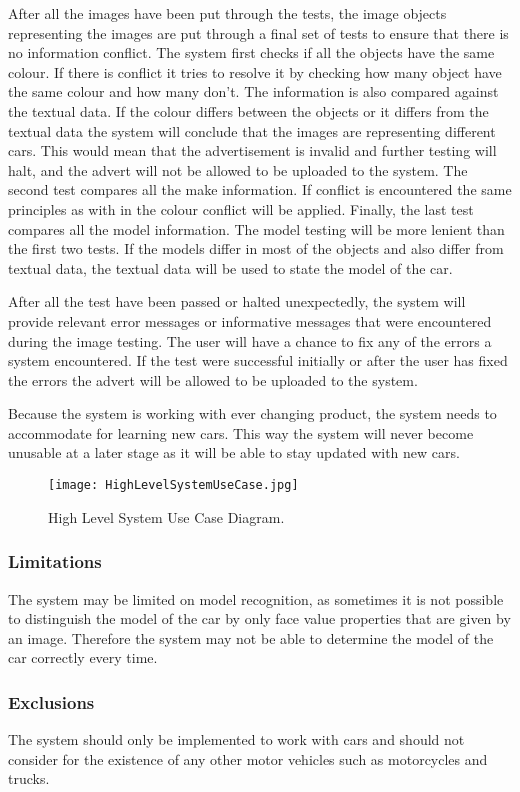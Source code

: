 After all the images have been put through the tests, the image objects representing the images are  put through a final set of tests to ensure that there is no information conflict. The system first checks if all the objects have the same colour. If  there is conflict it tries to resolve it by checking how many object have the same colour and how many don't. The information is also compared against the textual data. If the colour differs between the objects or it differs from the textual data the system will conclude that the images are representing different cars. This would mean that the advertisement is invalid and further testing will halt, and the advert will not be allowed to be uploaded to the system. The second test compares all the make information. If conflict is encountered the same principles as with in the colour conflict will be applied. Finally, the last test compares all the model information. The model testing will be more lenient than the first two tests. If the models differ in most of the objects and also differ from textual data, the textual data will be used to state the model of the car.

After all the test have been passed or halted unexpectedly, the system will provide relevant error messages or informative messages that were encountered during the image testing. The user will have a chance to fix any of the errors a system encountered. If the test were successful  initially or after the user has fixed the errors the advert will be allowed to be uploaded to the system.

Because the system is working with ever changing product, the system needs to accommodate for learning new cars. This way the system will never become unusable at a later stage as it will be able to stay updated with new cars.
\pagebreak
\begin{figure}[h!]
  \caption{High Level System Use Case Diagram.}
  \centering
	\texttt{[image: HighLevelSystemUseCase.jpg]}
\end{figure}

\subsubsection{Limitations}
The system may be limited on model recognition, as sometimes it is not possible to distinguish the model of the car by only face value properties that are given by an image. Therefore the system may not be able to determine the model of the car correctly every time.

\subsubsection{Exclusions}
The system should only be implemented to work with cars and should not consider for the existence of any other motor vehicles such as motorcycles and trucks.

